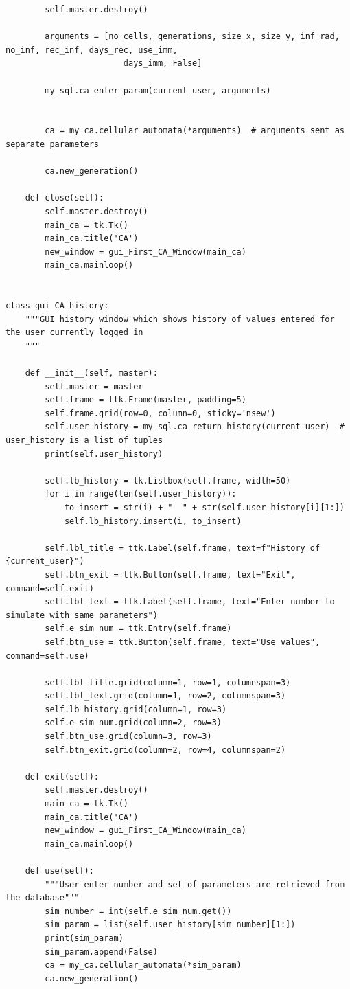 \documentclass[11pt, a4paper]{article}
\begin{document}
\begin{lstlisting}
        self.master.destroy()

        arguments = [no_cells, generations, size_x, size_y, inf_rad, no_inf, rec_inf, days_rec, use_imm,
                        days_imm, False]

        my_sql.ca_enter_param(current_user, arguments)


        ca = my_ca.cellular_automata(*arguments)  # arguments sent as separate parameters

        ca.new_generation()

    def close(self):
        self.master.destroy()
        main_ca = tk.Tk()
        main_ca.title('CA')
        new_window = gui_First_CA_Window(main_ca)
        main_ca.mainloop()


class gui_CA_history:
    """GUI history window which shows history of values entered for the user currently logged in
    """

    def __init__(self, master):
        self.master = master
        self.frame = ttk.Frame(master, padding=5)
        self.frame.grid(row=0, column=0, sticky='nsew')
        self.user_history = my_sql.ca_return_history(current_user)  # user_history is a list of tuples
        print(self.user_history)

        self.lb_history = tk.Listbox(self.frame, width=50)
        for i in range(len(self.user_history)):
            to_insert = str(i) + "  " + str(self.user_history[i][1:])
            self.lb_history.insert(i, to_insert)

        self.lbl_title = ttk.Label(self.frame, text=f"History of {current_user}")
        self.btn_exit = ttk.Button(self.frame, text="Exit", command=self.exit)
        self.lbl_text = ttk.Label(self.frame, text="Enter number to simulate with same parameters")
        self.e_sim_num = ttk.Entry(self.frame)
        self.btn_use = ttk.Button(self.frame, text="Use values", command=self.use)

        self.lbl_title.grid(column=1, row=1, columnspan=3)
        self.lbl_text.grid(column=1, row=2, columnspan=3)
        self.lb_history.grid(column=1, row=3)
        self.e_sim_num.grid(column=2, row=3)
        self.btn_use.grid(column=3, row=3)
        self.btn_exit.grid(column=2, row=4, columnspan=2)

    def exit(self):
        self.master.destroy()
        main_ca = tk.Tk()
        main_ca.title('CA')
        new_window = gui_First_CA_Window(main_ca)
        main_ca.mainloop()

    def use(self):
        """User enter number and set of parameters are retrieved from the database"""
        sim_number = int(self.e_sim_num.get())
        sim_param = list(self.user_history[sim_number][1:])
        print(sim_param)
        sim_param.append(False)
        ca = my_ca.cellular_automata(*sim_param)
        ca.new_generation()



\end{lstlisting}
\end{document}
